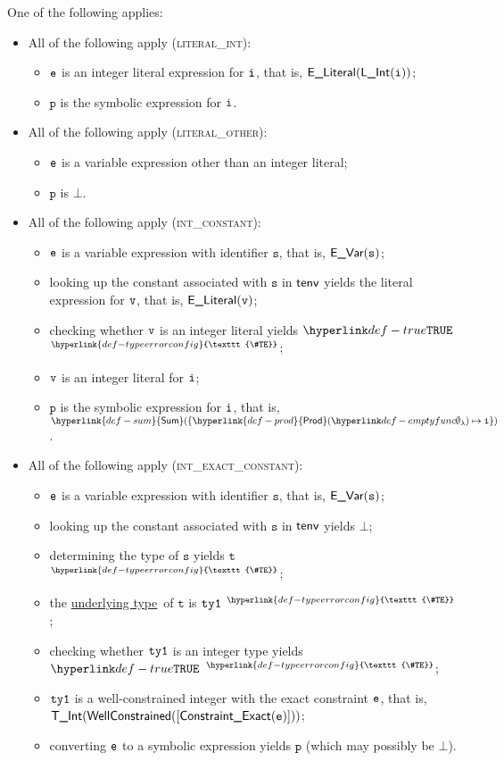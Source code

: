 \documentclass{book}
\newcommand\TypeErrorConfig[0]{\hyperlink{def-typeerrorconfig}{\texttt{\#TE}}}
\newcommand\ProseOrTypeError[0]{\hyperlink{def-proseortypeerror}{$^{\TypeErrorConfig}$}}
\newcommand\Prod[0]{\hyperlink{def-prod}{\textsf{Prod}}}
\newcommand\Sum[0]{\hyperlink{def-sum}{\textsf{Sum}}}
\newcommand\underlyingtype[0]{\hyperlink{def-underlyingtype}{underlying type}}
\newcommand\vp[0]{\texttt{p}}
\newcommand\vt[0]{\texttt{t}}
\newcommand\vs[0]{\texttt{s}}
\begin{document}
One of the following applies:
\begin{itemize}
  \item All of the following apply (\textsc{literal\_int}):
  \begin{itemize}
    \item $\texttt{e}$ is an integer literal expression for $\texttt{i}$, that is, $\textsf{E\_Literal}(\textsf{L\_Int}(\texttt{i}))$;
    \item $\vp$ is the symbolic expression for $\texttt{i}$.
  \end{itemize}

  \item All of the following apply (\textsc{literal\_other}):
  \begin{itemize}
    \item $\texttt{e}$ is a variable expression other than an integer literal;
    \item $\vp$ is $\bot$.
  \end{itemize}

  \item All of the following apply (\textsc{int\_constant}):
  \begin{itemize}
    \item $\texttt{e}$ is a variable expression with identifier $\vs$, that is, $\EVar(\vs)$;
    \item looking up the constant associated with $\vs$ in $\textsf{tenv}$ yields the literal expression for $\texttt{v}$, that is, $\textsf{E\_Literal}(\texttt{v})$;
    \item checking whether $\texttt{v}$ is an integer literal yields $\True$ \ProseOrTypeError;
    \item $\texttt{v}$ is an integer literal for $\texttt{i}$;
    \item $\vp$ is the symbolic expression for $\texttt{i}$, that is, $\Sum( \{ \Prod(\emptyfunc)\mapsto \vi \} )$.
  \end{itemize}

  \item All of the following apply (\textsc{int\_exact\_constant}):
  \begin{itemize}
    \item $\texttt{e}$ is a variable expression with identifier $\vs$, that is, $\EVar(\vs)$;
    \item looking up the constant associated with $\vs$ in $\textsf{tenv}$ yields $\bot$;
    \item determining the type of $\vs$ yields $\vt$ \ProseOrTypeError;
    \item the \underlyingtype\ of $\vt$ is $\texttt{ty1}$ \ProseOrTypeError;
    \item checking whether $\texttt{ty1}$ is an integer type yields $\True$ \ProseOrTypeError;
    \item $\texttt{ty1}$ is a well-constrained integer with the exact constraint $\texttt{e}$, that is, \\ $\textsf{T\_Int}(\textsf{WellConstrained}([\textsf{Constraint\_Exact}(\texttt{e})]))$;
    \item converting $\texttt{e}$ to a symbolic expression yields $\vp$ (which may possibly be $\bot$).
  \end{itemize}


\end{itemize}
\end{document}
